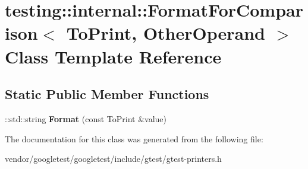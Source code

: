 \hypertarget{classtesting_1_1internal_1_1_format_for_comparison}{}\section{testing\+:\+:internal\+:\+:Format\+For\+Comparison$<$ To\+Print, Other\+Operand $>$ Class Template Reference}
\label{classtesting_1_1internal_1_1_format_for_comparison}
\subsection*{Static Public Member Functions}
\begin{DoxyCompactItemize}
\item 
\mbox{\label{classtesting_1_1internal_1_1_format_for_comparison_a2aeb688fc55b57abd3021d82eccad896}} 
\+::std\+::string {\bfseries Format} (const To\+Print \&value)
\end{DoxyCompactItemize}


The documentation for this class was generated from the following file\+:\begin{DoxyCompactItemize}
\item 
vendor/googletest/googletest/include/gtest/gtest-\/printers.\+h\end{DoxyCompactItemize}
